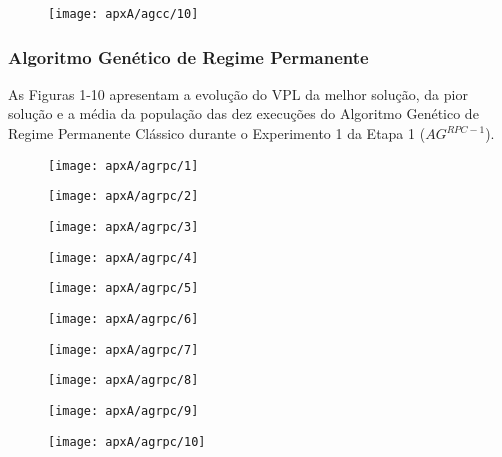 \begin{figure}[H]
\centering
\label{fig:graphGC1-10}
\texttt{[image: apxA/agcc/10]}
\end{figure}

\subsubsection{Algoritmo Genético de Regime Permanente}
As Figuras 1-10 apresentam a evolução do VPL da melhor solução, da pior solução e a média da população das dez execuções do Algoritmo Genético de Regime Permanente Clássico durante o Experimento 1 da Etapa 1 ($AG^{RPC-1}$).

\begin{figure}[H]
\centering

\texttt{[image: apxA/agrpc/1]}
\end{figure}

\begin{figure}[H]
\centering

\texttt{[image: apxA/agrpc/2]}
\end{figure}

\begin{figure}[H]
\centering

\texttt{[image: apxA/agrpc/3]}
\end{figure}

\begin{figure}[H]
\centering

\texttt{[image: apxA/agrpc/4]}
\end{figure}

\begin{figure}[H]
\centering

\texttt{[image: apxA/agrpc/5]}
\end{figure}

\begin{figure}[H]
\centering

\texttt{[image: apxA/agrpc/6]}
\end{figure}

\begin{figure}[H]
\centering

\texttt{[image: apxA/agrpc/7]}
\end{figure}

\begin{figure}[H]
\centering

\texttt{[image: apxA/agrpc/8]}
\end{figure}

\begin{figure}[H]
\centering

\texttt{[image: apxA/agrpc/9]}
\end{figure}

\begin{figure}[H]
\centering

\texttt{[image: apxA/agrpc/10]}
\end{figure}


